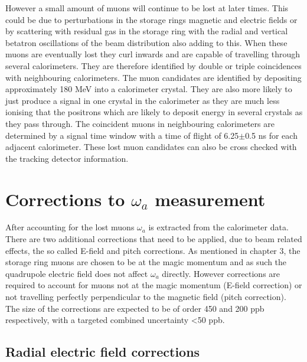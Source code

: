However a small amount of muons will continue to be lost at later times. This could be due to perturbations in the storage rings magnetic and electric fields or by scattering with residual gas in the storage ring with the radial and vertical betatron oscillations of the beam distribution also adding to this. When these muons are eventually lost they curl inwards and are capable of travelling through several calorimeters. They are therefore identified by double or triple coincidences with neighbouring calorimeters. The muon candidates are identified by depositing approximately 180 MeV into a calorimeter crystal. They are also more likely to just produce a signal in one crystal in the calorimeter as they are much less ionising that the positrons which are likely to deposit energy in several crystals as they pass through. The coincident muons in neighbouring calorimeters are determined by a signal time window with a time of flight of 6.25$\pm$0.5 ns \cite{muonloss2} for each adjacent calorimeter. These lost muon candidates can also be cross checked with the tracking detector information.

\section{Corrections to $\omega_{a}$ measurement}

After accounting for the lost muons $\omega_{a}$ is extracted from the calorimeter data. There are two additional corrections that need to be applied, due to beam related effects, the so called E-field and pitch corrections. As mentioned in chapter 3, the storage ring muons are chosen to be at the magic momentum and as such the quadrupole electric field does not affect $\omega_{a}$ directly. However corrections are required to account for muons not at the magic momentum (E-field correction) or not travelling perfectly perpendicular to the magnetic field (pitch correction). The size of the corrections are expected to be of order 450 and 200 ppb respectively, with a targeted combined uncertainty <50 ppb.  

\subsection{Radial electric field corrections}

